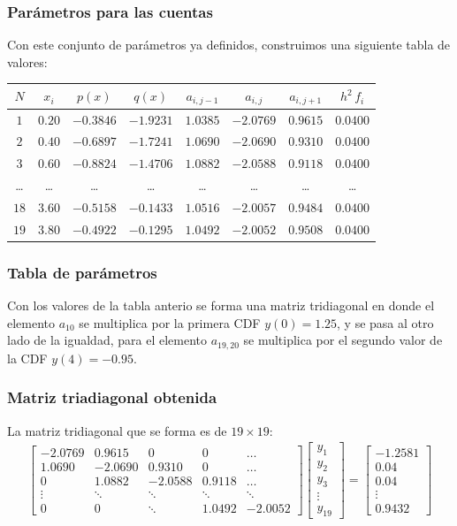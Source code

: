\begin{frame}
\frametitle{Parámetros para las cuentas}
\fontsize{10}{10}\selectfont
Con este conjunto de parámetros ya definidos, construimos una siguiente tabla de valores:
\begin{table}
\begin{tabular}{c | c | c | c | c | c | c | c }
$N$ &  $x_{i}$ & $p(x)$ & $q(x)$ & $a_{i,j-1}$ & $a_{i,j}$ & $a_{i, j+1}$ & $h^{2} \, f_{i}$ \\\hline 
$1$ &  $0.20$ & $-0.3846$ & $-1.9231$ & $1.0385$ & $-2.0769$ & $0.9615$ & $0.0400$ \\\hline
$2$ &  $0.40$ & $-0.6897$ & $-1.7241$ & $1.0690$ & $-2.0690$ & $0.9310$ & $0.0400$ \\\hline
$3$ &  $0.60$ & $-0.8824$ & $-1.4706$ & $1.0882$ & $-2.0588$ & $0.9118$ & $0.0400$ \\\hline
\ldots & \ldots & \ldots & \ldots & \ldots & \ldots & \ldots & \ldots \\\hline
$18$ &  $3.60$ & $-0.5158$ & $-0.1433$ & $1.0516$ & $-2.0057$ & $0.9484$ & $0.0400$ \\\hline
$19$ &  $3.80$ & $-0.4922$ & $-0.1295$ & $1.0492$ & $-2.0052$ & $0.9508$ & $0.0400$ \\\hline
\end{tabular}
\end{table}
\end{frame}
\begin{frame}
\frametitle{Tabla de parámetros}
Con los valores de la tabla anterio se forma una matriz tridiagonal en donde el elemento $a_{10}$ se multiplica por la primera CDF $y(0)=1.25$, y se pasa al otro lado de la igualdad, para el elemento $a_{19, 20}$ se multiplica por el segundo valor de la CDF $y(4) = -0.95$.
\end{frame}
\begin{frame}
\frametitle{Matriz triadiagonal obtenida}
\fontsize{10}{10}\selectfont
La matriz tridiagonal que se forma es de $19 \times 19$:
\begin{align*}
\begin{bmatrix}
-2.0769 & 0.9615 & 0 & 0 & \ldots \\
1.0690 & -2.0690 & 0.9310 & 0 & \ldots \\
0 & 1.0882 & -2.0588 & 0.9118 & \ldots \\
\vdots & \ddots & \ddots & \ddots & \ddots \\
0 & 0 & \ddots & 1.0492 & -2.0052
\end{bmatrix}
\begin{bmatrix}
y_{1} \\
y_{2} \\
y_{3} \\
\vdots \\
y_{19}
\end{bmatrix}
= \begin{bmatrix}
-1.2581 \\
0.04 \\
0.04 \\
\vdots \\
0.9432
\end{bmatrix}
\end{align*}
\end{frame}
